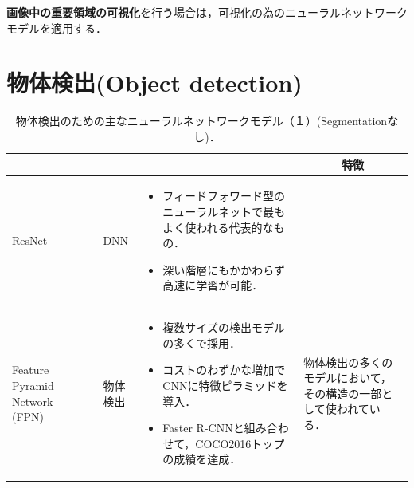 \documentclass[originalpaper]{jsaiart}     %
\begin{document}
{\bf 画像中の重要領域の可視化}を行う場合は，可視化の為のニューラルネットワークモデル\cite{SCDVPB17,SCDVPB20}を適用する．

\section{物体検出(Object detection)}
\begin{table}
    \caption{物体検出のための主なニューラルネットワークモデル（１）(Segmentationなし)．}
    \label{tbl-cheat1}
    \begin{center}
        \setlength{\tabcolsep}{3pt}
        \footnotesize
        \begin{tabularx}{\linewidth}{Xp{1.5cm}Xp{7cm}X} \toprule
            \centering{モデル名称} & \centering{文献} & \centering{用途} & \centering{概要} & \multicolumn{1}{c}{特徴} \\ \midrule

            ResNet & \cite{HZRS16} & DNN & 
            \begin{itemize}
                \vspace{-0.7\baselineskip}
                \setlength{\leftskip}{-3mm}
                \item フィードフォワード型のニューラルネットで最もよく使われる代表的なもの．
                \item  深い階層にもかかわらず高速に学習が可能．
            \end{itemize} &   \\
            
            Feature Pyramid Network (FPN) & \cite{LDGHHB17} & 物体検出 & 
            \begin{itemize}
                \vspace{-0.7\baselineskip}
                \setlength{\leftskip}{-3mm}
                \item 複数サイズの検出モデルの多くで採用．
                \item コストのわずかな増加でCNNに特徴ピラミッドを導入．
                \item Faster R-CNNと組み合わせて，COCO2016トップの成績を達成． 
            \end{itemize}
            & 物体検出の多くのモデルにおいて，その構造の一部として使われている．\\


\end{tabularx}
\end{center}
\end{table}
\end{document}
